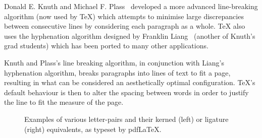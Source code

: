 Donald E. Knuth and Michael F. Plass~\cite{Knuth1981} developed a more advanced line-breaking algorithm (now used by \TeX{}) which attempts to minimise large discrepancies between consecutive lines by considering each paragraph as a whole. \TeX{} also uses the hyphenation algorithm designed by Franklin Liang~\cite{Liang1983} (another of Knuth's grad students) which has been ported to many other applications.

Knuth and Plass's line breaking algorithm, in conjunction with Liang's hyphenation algorithm, breaks paragraphs into lines of text to fit a page, resulting in what can be considered an aesthetically optimal configuration. \TeX 's default behaviour is then to alter the spacing between words in order to justify the line to fit the measure of the page.

\begin{figure}
 \caption[Examples of microtypographical techniques]{Examples of various letter-pairs and their kerned (left) or ligature (right) equivalents, as typeset by pdf\LaTeX{}.}
 \label{fig:kern-lig}
\end{figure}

